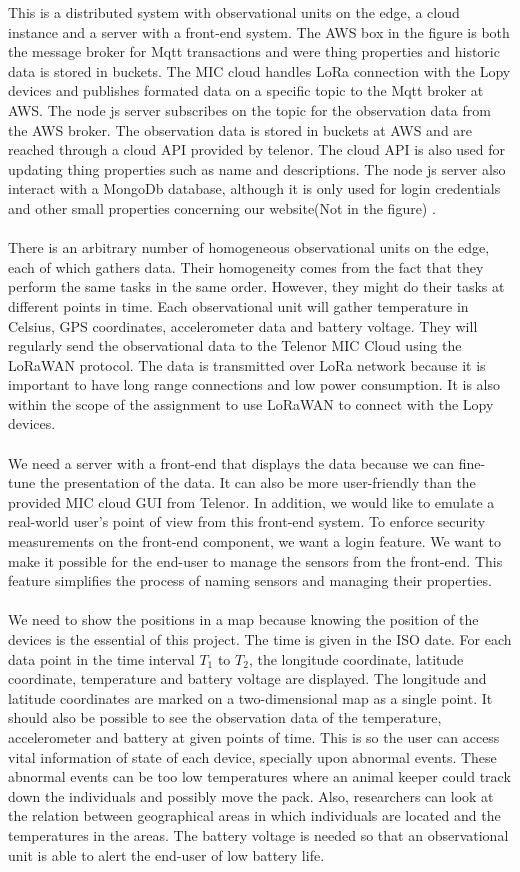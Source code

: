 		This is a distributed system with observational units on the edge, a cloud instance and a server with a front-end system. The AWS box in the figure is both the message broker for Mqtt transactions and were thing properties and historic data is stored in buckets. The MIC cloud handles LoRa connection with the Lopy devices and publishes formated data on a specific topic to the Mqtt broker at AWS. The node js server subscribes on the topic for the observation data from the AWS broker. The observation data is stored in buckets at AWS and are reached through a cloud API provided by telenor. The cloud API is also used for updating thing properties such as name and descriptions. The node js server also interact with a MongoDb database, although it is only used for login credentials and other small properties concerning our website(Not in the figure) . 
		\\\\
		There is an arbitrary number of homogeneous observational units on the edge, each of which gathers data. Their homogeneity comes from the fact that they perform the same tasks in the same order. However, they might do their tasks at different points in time. Each observational unit will gather temperature in Celsius, GPS coordinates, accelerometer data and battery voltage. They will regularly send the observational data to the Telenor MIC Cloud using the LoRaWAN protocol. The data is transmitted over LoRa network because it is important to have long range connections and low power consumption. It is also within the scope of the assignment to use LoRaWAN to connect with the Lopy devices.  
		\\\\
		We need a server with a front-end that displays the data because we can fine-tune the presentation of the data. It can also be more user-friendly than the provided MIC cloud GUI from Telenor. In addition, we would like to emulate a real-world user’s point of view from this front-end system. To enforce security measurements on the front-end component, we want a login feature. We want to make it possible for the end-user to manage the sensors from the front-end. This feature simplifies the process of naming sensors and managing their properties. 	
		\\\\
		We need to show the positions in a map because knowing the position of the devices is the essential of this project. The time is given in the ISO date. For each data point in the time interval $T_1$ to $T_2$, the longitude coordinate, latitude coordinate, temperature and battery voltage are displayed. The longitude and latitude coordinates are marked on a two-dimensional map as a single point. It should also be possible to see the observation data of the temperature, accelerometer and battery at given points of time. This is so the user can access vital information of state of each device, specially upon abnormal events. These abnormal events can be too low temperatures where an animal keeper could track down the individuals and possibly move the pack. Also, researchers can look at the relation between geographical areas in which individuals are located and the temperatures in the areas. The battery voltage is needed so that an observational unit is able to alert the end-user of low battery life.  	
